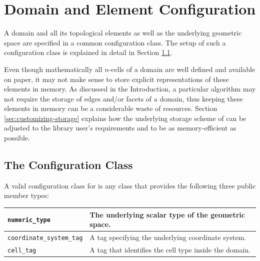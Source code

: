 \chapter{Domain and Element Configuration} \label{chap:domainconfig}

A domain and all its topological elements as well as the underlying geometric space are specified in a common configuration class.
The setup of such a configuration class is explained in detail in Section \ref{sec:config-class}.

Even though mathematically all $n$-cells of a domain are well defined and available on paper, it may not make sense to store explicit representations of these elements in memory.
As discussed in the Introduction, a particular algorithm may not require the storage of edges and/or facets of a domain, thus keeping these elements in memory can be a considerable waste of resources.
Section \ref{sec:customizing-storage} explains how the underlying storage scheme of {\ViennaGrid} can be adjusted to the library user's requirements and to be as memory-efficient as possible.


\section{The Configuration Class} \label{sec:config-class}
A valid configuration class for {\ViennaGrid} is any class that provides the following three public member types:
\begin{center}
\begin{tabular}{|l|p{8cm}|}
\hline
 \lstinline|numeric_type|   & The underlying scalar type of the geometric space. \\
\hline
 \lstinline|coordinate_system_tag| & A tag specifying the underlying coordinate system.\\
\hline
 \lstinline|cell_tag|       & A tag that identifies the cell type inside the domain.\\
\hline
\end{tabular}
\end{center}

